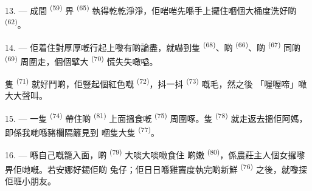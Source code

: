 13. --- 成間 \textsuperscript{(59)} 畀
\textsuperscript{(65)} 執得乾乾淨淨，佢啱啱先喺手上攞住嗰個大桶度洗好啲
 \textsuperscript{(62)}。

\VUsaut{3.0mm}
\VUsaut{3.0mm}

14. --- 佢着住對厚厚嘅行起上嚟有啲論盡，就嚇到隻
\textsuperscript{(68)}、啲 \textsuperscript{(66)}、啲
\textsuperscript{(67)} 同啲 \textsuperscript{(69)} 周圍走，個個擘大
 \textsuperscript{(70)} 慌失失噉嗌。

隻 \textsuperscript{(71)} 就好鬥啲，佢豎起個紅色嘅
\textsuperscript{(72)}，抖一抖 \textsuperscript{(73)} 嘅毛，然之後
「喔喔啼」噉大大聲叫。

15. --- 一隻 \textsuperscript{(74)} 帶住啲
\textsuperscript{(81)} 上面搵食嘅 \textsuperscript{(75)} 周圍啄。隻
 \textsuperscript{(78)} 就走返去搵佢阿媽，即係我哋喺豬欄隔籬見到
嗰隻大隻 \textsuperscript{(77)}。

16. --- 喺自己嘅籠入面，啲 \textsuperscript{(79)} 大啖大啖噉食住
啲嫩 \textsuperscript{(80)}，係農莊主人個女攞嚟畀佢哋嘅。若安娜好錫佢啲
兔仔；佢日日喺雞竇度執完啲新鮮 \textsuperscript{(76)} 之後，就嚟探
佢班小朋友。

\VUsaut{6.0mm}
\VUfilet{22mm}
